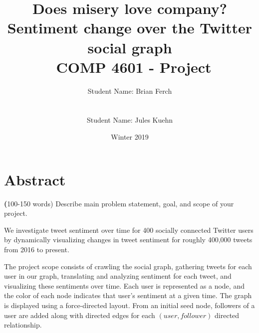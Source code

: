 \documentclass[12pt]{article}
\begin{document}
\title {
    Does misery love company?\\
    Sentiment change over the Twitter social graph\\\
    \large COMP 4601 - Project}
\author{Student Name: Brian Ferch\\
\\\\ 
Student Name: Jules Kuehn\\
}
\date{Winter 2019}
\maketitle


% 



\section{Abstract}
\textbf (100-150 words) Describe main problem statement, goal, and scope of your project.\newline

We investigate tweet sentiment over time for 400 socially connected Twitter users by dynamically visualizing changes in tweet sentiment for roughly 400,000 tweets from 2016 to present.\newline

The project scope consists of crawling the social graph, gathering tweets for each user in our graph, translating and analyzing sentiment for each tweet, and visualizing these sentiments over time. Each user is represented as a node, and the color of each node indicates that user’s sentiment at a given time. The graph is displayed using a force-directed layout. From an initial seed node, followers of a user are added along with directed edges for each $(user, follower)$ directed relationship.
\end{document}
